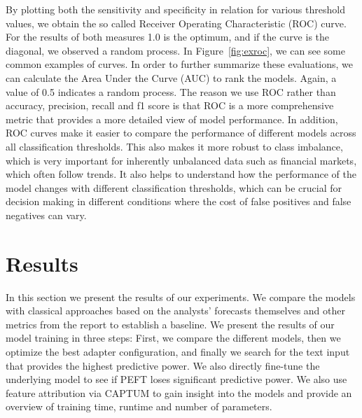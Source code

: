 \documentclass[conference]{IEEEtran}
\begin{document}
By plotting both the sensitivity and specificity in relation for various threshold values, we obtain the so called Receiver Operating Characteristic (ROC) curve. For the results of both measures 1.0 is the optimum, and if the curve is the diagonal, we observed a random process.  In Figure~\ref{fig:exroc}, we can see some common examples of curves. In order to further summarize these evaluations, we can calculate the Area Under the Curve (AUC) to rank the models. Again, a value of 0.5 indicates a random process.  
The reason we use ROC rather than accuracy, precision, recall and f1 score is that ROC is a more comprehensive metric that provides a more detailed view of model performance. In addition, ROC curves make it easier to compare the performance of different models across all classification thresholds. This also makes it more robust to class imbalance, which is very important for inherently unbalanced data such as financial markets, which often follow trends. It also helps to understand how the performance of the model changes with different classification thresholds, which can be crucial for decision making in different conditions where the cost of false positives and false negatives can vary. \cite{Hastie2009}  \cite{Kauermann2021}  \cite{Russell2021}



\section{Results}%
In this section we present the results of our experiments. We compare the models with classical approaches based on the analysts' forecasts themselves and other metrics from the report to establish a baseline. We present the results of our model training in three steps: First, we compare the different models, then we optimize the best adapter configuration, and finally we search for the text input that provides the highest predictive power. We also directly fine-tune the underlying model to see if PEFT loses significant predictive power. We also use feature attribution via CAPTUM to gain insight into the models and provide an overview of training time, runtime and number of parameters.
\end{document}
